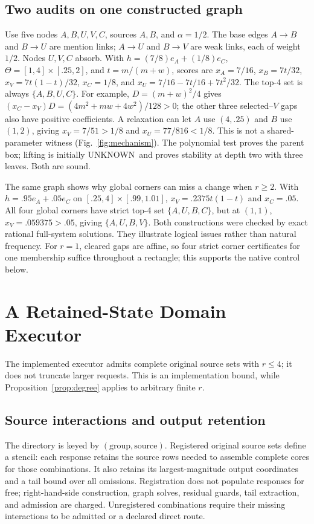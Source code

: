 \documentclass[conference]{IEEEtran}
\newcommand{\unknown}{\textsf{UNKNOWN}}
\begin{document}
\subsection{Two audits on one constructed graph}
\label{sec:constructed}
Use five nodes $A,B,U,V,C$, sources $A,B$, and $\alpha=1/2$. The base edges $A\to B$ and $B\to U$ are mention links; $A\to U$ and $B\to V$ are weak links, each of weight $1/2$. Nodes $U,V,C$ absorb. With $h=(7/8)e_A+(1/8)e_C$, $\Theta=[1,4]\times[.25,2]$, and $t=m/(m+w)$, scores are $x_A=7/16$, $x_B=7t/32$, $x_V=7t(1-t)/32$, $x_C=1/8$, and $x_U=7/16-7t/16+7t^2/32$. The top-4 set is always $\{A,B,U,C\}$. For example, $D=(m+w)^2/4$ gives $(x_C-x_V)D=(4m^2+mw+4w^2)/128>0$; the other three selected--$V$ gaps also have positive coefficients. A relaxation can let $A$ use $(4,.25)$ and $B$ use $(1,2)$, giving $x_V=7/51>1/8$ and $x_U=77/816<1/8$. This is not a shared-parameter witness (Fig.~\ref{fig:mechanism}). The polynomial test proves the parent box; lifting is initially \unknown\ and proves stability at depth two with three leaves. Both are sound.

The same graph shows why global corners can miss a change when $r\geq2$. With $h=.95e_A+.05e_C$ on $[.25,4]\times[.99,1.01]$, $x_V=.2375t(1-t)$ and $x_C=.05$. All four global corners have strict top-4 set $\{A,U,B,C\}$, but at $(1,1)$, $x_V=.059375>.05$, giving $\{A,U,B,V\}$. Both constructions were checked by exact rational full-system solutions. They illustrate logical issues rather than natural frequency. For $r=1$, cleared gaps are affine, so four strict corner certificates for one membership suffice throughout a rectangle; this supports the native control below.

\section{A Retained-State Domain Executor}
\label{sec:execution}
The implemented executor admits complete original source sets with $r\leq4$; it does not truncate larger requests. This is an implementation bound, while Proposition~\ref{prop:degree} applies to arbitrary finite $r$.
\subsection{Source interactions and output retention}
The directory is keyed by $(\text{group},\text{source})$. Registered original source sets define a stencil: each response retains the source rows needed to assemble complete cores for those combinations. It also retains its largest-magnitude output coordinates and a tail bound over all omissions. Registration does not populate responses for free; right-hand-side construction, graph solves, residual guards, tail extraction, and admission are charged. Unregistered combinations require their missing interactions to be admitted or a declared direct route.
\end{document}
